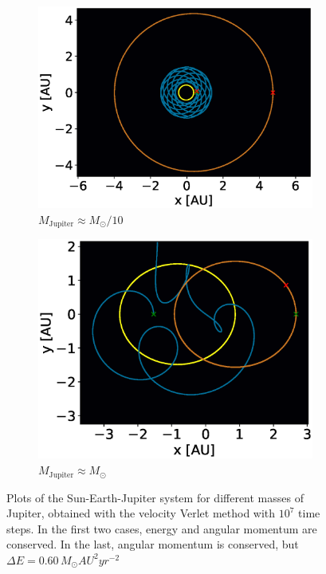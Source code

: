 \documentclass[a4paper,10pt,twocolumn]{article}
\newcommand{\un}[1]{\,\si{#1}}		%
\begin{document}
\begin{figure}
\begin{subfigure}{.5\textwidth}
		\centering
		\includegraphics[width=\linewidth]{esjx10010vv7.eps}
		\caption{$M_\text{Jupiter} \approx M_\odot/10$}
		\label{fig:esj10}
	\end{subfigure}%
	\begin{subfigure}{.5\textwidth}
		 \centering
		 \includegraphics[width=\linewidth]{esjx100010vv7.eps}
		 \caption{$M_\text{Jupiter} \approx M_\odot$}
		 \label{fig:esj1}
	\end{subfigure}
	\caption{Plots of the Sun-Earth-Jupiter system for different masses of Jupiter, obtained with the velocity Verlet method with $10^7$ time steps. In the first two cases, energy and angular momentum are conserved. In the last, angular momentum is conserved, but $\Delta E = 0.60\un{M_\odot AU^2 yr^{-2}}$}
	\label{fig:esj}
\end{figure}
\end{document}
